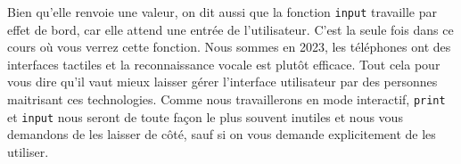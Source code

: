 \documentclass{magnoliaold}
\begin{document}
\noindent Bien qu'elle renvoie une valeur, on dit aussi que la fonction \verb_input_
travaille par effet de bord, car elle attend une entrée de l'utilisateur.
C'est la seule fois dans ce cours où vous verrez cette fonction. Nous sommes en
2023, les téléphones ont des interfaces tactiles et la reconnaissance vocale est
plutôt efficace. Tout cela pour vous dire qu'il vaut mieux laisser gérer l'interface utilisateur
par des personnes maitrisant ces technologies. Comme nous travaillerons en mode
interactif, \verb_print_ et \verb_input_ nous seront de toute façon le plus souvent inutiles et nous vous
demandons de les laisser de côté, sauf si on vous demande explicitement de les utiliser.











\end{document}
